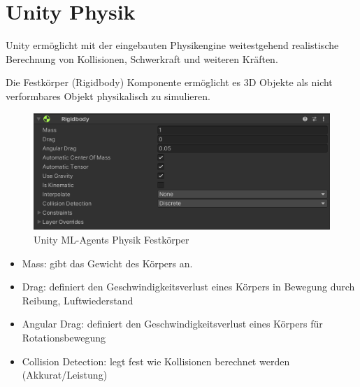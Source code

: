 {\section{Unity Physik}}
\label{sec:physik}
Unity ermöglicht mit der eingebauten Physikengine weitestgehend realistische Berechnung von Kollisionen, Schwerkraft und weiteren Kräften.



Die Festkörper (Rigidbody) Komponente ermöglicht es 3D Objekte als nicht verformbares Objekt physikalisch zu simulieren.
\begin{figure}[H]
  \centering  
  \includegraphics[scale=0.5]{img/physik_festkoerper.png}
  \caption{Unity ML-Agents Physik Festkörper}
  \label{fig:physik_festkoerper}
\end{figure}
\begin{itemize}
  \item Mass: gibt das Gewicht des Körpers an.
  \item Drag: definiert den Geschwindigkeitsverlust eines Körpers in Bewegung durch Reibung, Luftwiederstand
  \item Angular Drag: definiert den Geschwindigkeitsverlust eines Körpers für Rotationsbewegung
  \item Collision Detection: legt fest wie Kollisionen berechnet werden (Akkurat/Leistung)
 \end{itemize}
 
